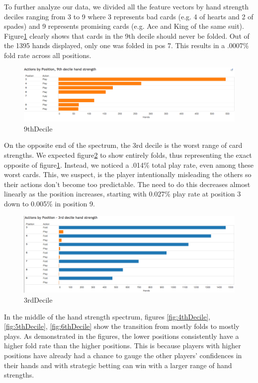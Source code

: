 \documentclass[twoside]{article}
\begin{document}
\begin{multicols}{2}
To further analyze our data, we divided all the feature vectors by hand strength deciles ranging from 3 to 9 where 3 represents bad cards (e.g. 4 of hearts and 2 of spades) and 9 represents promising cards (e.g. Ace and King of the same suit). Figure\ref{fig:9thDecile} clearly shows that cards in the 9th decile should never be folded. Out of the 1395 hands displayed, only one was folded in pos 7. This results in a .0007\% fold rate across all positions. 

\begin{figure}[H]
  \centering
  \centerline{\includegraphics[width=1\columnwidth]{9thDecile.png}}
   \caption{9thDecile}
  \label{fig:9thDecile}
\end{figure}

On the opposite end of the spectrum, the 3rd decile is the worst range of card strengths. We expected figure\ref{fig:3rdDecile} to show entirely folds, thus representing the exact opposite of figure\ref{fig:9thDecile}. Instead, we noticed a .014\% total play rate, even among these worst cards. This, we suspect, is the player intentionally misleading the others so their actions don't become too predictable. The need to do this decreases almost linearly as the position increases, starting with 0.027\% play rate at position 3 down to 0.005\% in position 9. 

\begin{figure}[H]
  \centering
  \centerline{\includegraphics[width=1\columnwidth]{3rdDecile.png}}
   \caption{3rdDecile}
  \label{fig:3rdDecile}
\end{figure}

In the middle of the hand strength spectrum, figures \ref{fig:4thDecile}, \ref{fig:5thDecile}, \ref{fig:6thDecile} show the transition from mostly folds to mostly plays. As demonstrated in the figures, the lower positions consistently have a higher fold rate than the higher positions. This is because players with higher positions have already had a chance to gauge the other players' confidences in their hands and with strategic betting can win with a larger range of hand strengths.


\end{multicols}
\end{document}
